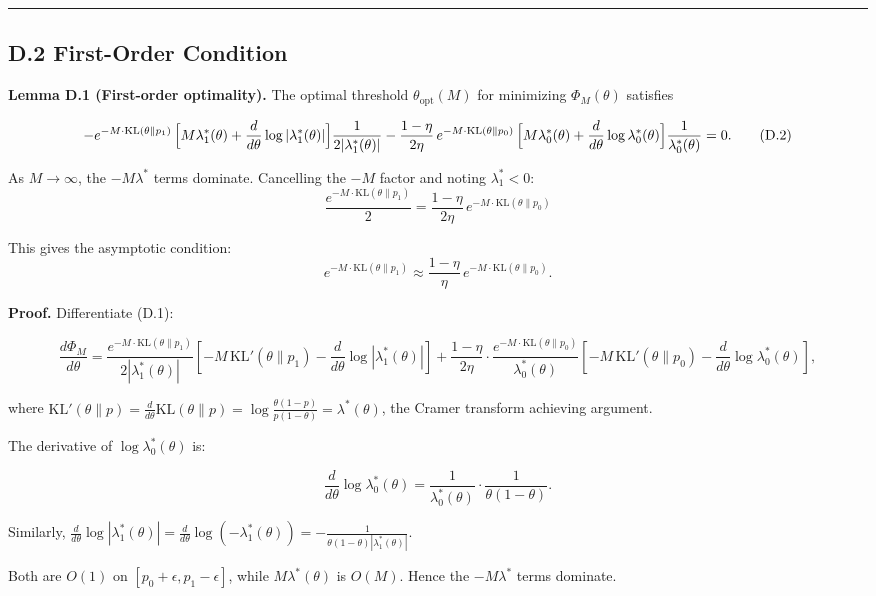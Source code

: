 \documentclass[
  12pt,
]{ctexart}
\begin{document}
\begin{center}\rule{0.5\linewidth}{0.5pt}\end{center}

\subsection{D.2 First-Order Condition}\label{d.2-first-order-condition}

\textbf{Lemma D.1 (First-order optimality).} The optimal threshold
\(\theta_{\text{opt}}(M)\) for minimizing \(\Phi_M(\theta)\) satisfies

\[
-e^{-M\cdot\text{KL}(\theta\|p_1)}\,
\Bigl[M\lambda_1^*(\theta) + \frac{d}{d\theta}\log|\lambda_1^*(\theta)|\Bigr]
\frac{1}{2|\lambda_1^*(\theta)|}
- \frac{1-\eta}{2\eta}\,e^{-M\cdot\text{KL}(\theta\|p_0)}\,
\Bigl[M\lambda_0^*(\theta) + \frac{d}{d\theta}\log\lambda_0^*(\theta)\Bigr]
\frac{1}{\lambda_0^*(\theta)} = 0. \tag{D.2}
\]

As \(M\to\infty\), the \(-M\lambda^*\) terms dominate. Cancelling the
\(-M\) factor and noting \(\lambda_1^* < 0\):
\[\frac{e^{-M\cdot\text{KL}(\theta\|p_1)}}{2} = \frac{1-\eta}{2\eta}\,e^{-M\cdot\text{KL}(\theta\|p_0)}\]

This gives the asymptotic condition: \[
e^{-M\cdot\text{KL}(\theta\|p_1)} \approx \frac{1-\eta}{\eta}\,e^{-M\cdot\text{KL}(\theta\|p_0)}. \tag{D.3}
\]

\textbf{Proof.} Differentiate (D.1):

\[
\frac{d\Phi_M}{d\theta} = \frac{e^{-M\cdot\text{KL}(\theta\|p_1)}}{2|\lambda_1^*(\theta)|}
\left[-M\,\text{KL}'(\theta\|p_1) - \frac{d}{d\theta}\log|\lambda_1^*(\theta)|\right]
+ \frac{1-\eta}{2\eta}\cdot\frac{e^{-M\cdot\text{KL}(\theta\|p_0)}}{\lambda_0^*(\theta)}
\left[-M\,\text{KL}'(\theta\|p_0) - \frac{d}{d\theta}\log\lambda_0^*(\theta)\right],
\]

where
\(\text{KL}'(\theta\|p) = \frac{d}{d\theta}\text{KL}(\theta\|p) = \log\frac{\theta(1-p)}{p(1-\theta)} = \lambda^*(\theta)\),
the Cramer transform achieving argument.

The derivative of \(\log\lambda_0^*(\theta)\) is:

\[
\frac{d}{d\theta}\log\lambda_0^*(\theta) = \frac{1}{\lambda_0^*(\theta)}\cdot\frac{1}{\theta(1-\theta)}.
\]

Similarly,
\(\frac{d}{d\theta}\log|\lambda_1^*(\theta)| = \frac{d}{d\theta}\log(-\lambda_1^*(\theta)) = -\frac{1}{\theta(1-\theta)|\lambda_1^*(\theta)|}\).

Both are \(O(1)\) on \([p_0+\epsilon, p_1-\epsilon]\), while
\(M\lambda^*(\theta)\) is \(O(M)\). Hence the \(-M\lambda^*\) terms
dominate.
\end{document}
